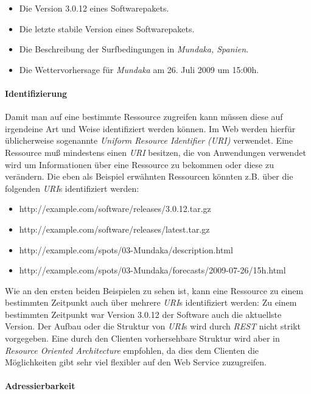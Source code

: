 \begin{itemize}
\item Die Version 3.0.12 eines Softwarepakets.
\item Die letzte stabile Version eines Softwarepakets.
\item Die Beschreibung der Surfbedingungen in \textit{Mundaka,
    Spanien}.
\item Die Wettervorhersage für \textit{Mundaka} am 26. Juli 2009 um 15:00h.
\end{itemize}

\paragraph{Identifizierung}
\label{paragraph:identifizierung}
Damit man auf eine bestimmte Ressource zugreifen kann müssen diese auf
irgendeine Art und Weise identifiziert werden können. Im Web werden
hierfür üblicherweise sogenannte \textit{Uniform Resource Identifier
  (URI)} 
verwendet. Eine Ressource muß mindestens einen \textit{URI} besitzen,
die von Anwendungen verwendet wird um Informationen über eine
Ressource zu bekommen oder diese zu verändern. Die eben als Beispiel
erwähnten Ressourcen könnten z.B. über die folgenden \textit{URI}s
identifiziert werden:

{\sf \small
  \begin{itemize}
  \item http://example.com/software/releases/3.0.12.tar.gz
  \item http://example.com/software/releases/latest.tar.gz
  \item http://example.com/spots/03-Mundaka/description.html
  \item http://example.com/spots/03-Mundaka/forecasts/2009-07-26/15h.html
  \end{itemize}
}

Wie an den ersten beiden Beispielen zu sehen ist, kann eine Ressource
zu einem bestimmten Zeitpunkt auch über mehrere \textit{URI}s
identifiziert werden: Zu einem bestimmten Zeitpunkt war Version 3.0.12
der Software auch die aktuellste Version. Der Aufbau oder die Struktur
von \textit{URI}s wird durch \textit{REST} nicht strikt vorgegeben.
Eine durch den Clienten vorhersehbare Struktur wird aber in
\textit{Resource Oriented Architecture} empfohlen, da dies dem
Clienten die Möglichkeiten gibt sehr viel flexibler auf den Web
Service zuzugreifen.

\paragraph{Adressierbarkeit}

